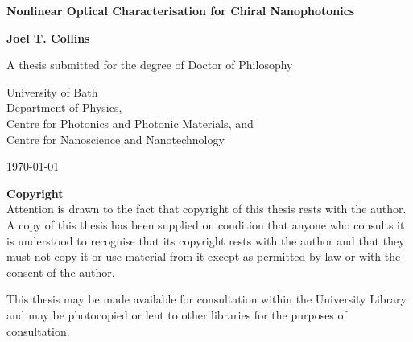 \begin{center}
    \vspace*{1cm}
    
    \LARGE
    \textbf{Nonlinear Optical Characterisation for Chiral Nanophotonics}
    
    \vspace{0.5cm}
    \large
    \textbf{Joel T. Collins}
    
    \vspace{1.5cm}
    \normalsize
    A thesis submitted for the degree of Doctor of Philosophy
    
    \vspace{0.8cm}
    University of Bath\\
    Department of Physics,\\
    Centre for Photonics and Photonic Materials, and\\
    Centre for Nanoscience and Nanotechnology
    
    \vspace{0.5cm}
    \today
    
    \vspace{1.5cm}

    \textbf{Copyright}\\
    Attention is drawn to the fact that copyright of this thesis rests with the author. A copy of this thesis has been supplied on condition that anyone who consults it is understood to recognise that its copyright rests with the author and that they must not copy it or use material from it except as permitted by law or with the consent of the author. 

    \vspace{1.5cm}

    This thesis may be made available for consultation within the University Library and may be photocopied or lent to other libraries for the purposes of consultation. 



\end{center}